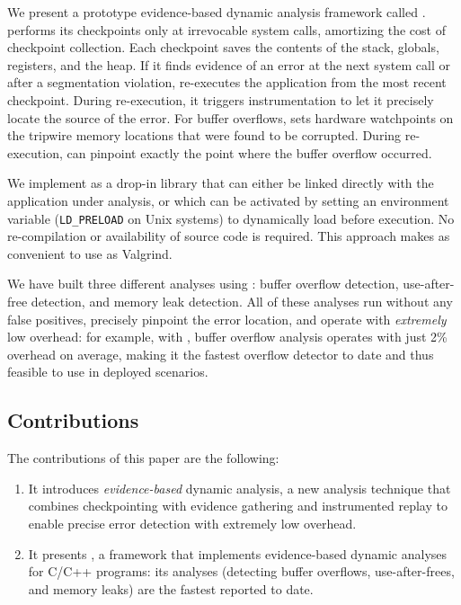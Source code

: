 We present a prototype evidence-based dynamic analysis framework called \doubletake{}. \doubletake{} performs its checkpoints only at
irrevocable system calls, amortizing the cost of checkpoint
collection. Each checkpoint saves the contents of the stack,
globals, registers, and the heap. If it finds evidence of an error at
the next system call or after a segmentation violation, \doubletake{}
re-executes the application from the most recent checkpoint. During
re-execution, it triggers instrumentation to let it precisely locate
the source of the error. For buffer overflows, \doubletake{} sets hardware watchpoints on the tripwire
memory locations that were found to be corrupted. During re-execution,
\doubletake{} can pinpoint exactly the point where the buffer overflow
occurred.

We implement \doubletake{} as a drop-in library that can either be
linked directly with the application under analysis, or which can be
activated by setting an environment variable (\texttt{LD\_PRELOAD} on
Unix systems) to dynamically load \doubletake{} before execution. No
re-compilation or availability of source code is required. This
approach makes \doubletake{} as convenient to use as Valgrind.

We have built three different analyses using \doubletake{}: buffer
overflow detection, use-after-free detection, and memory leak
detection. All of these analyses run without any false positives,
precisely pinpoint the error location, and operate
with \emph{extremely} low overhead: for example, with \doubletake{},
buffer overflow analysis operates with just 2\% overhead on average,
making it the fastest overflow detector to date and thus feasible to
use in deployed scenarios.

\subsection*{Contributions}

The contributions of this paper are the following:

\begin{enumerate}

\item It introduces \emph{evidence-based} dynamic analysis, a new analysis technique that combines checkpointing with evidence gathering and instrumented replay to enable precise error detection with extremely low overhead.

\item It presents \doubletake{}, a framework that implements evidence-based dynamic analyses for C/C++ programs: its analyses (detecting buffer overflows, use-after-frees, and memory leaks) are the fastest reported to date.

\end{enumerate}


